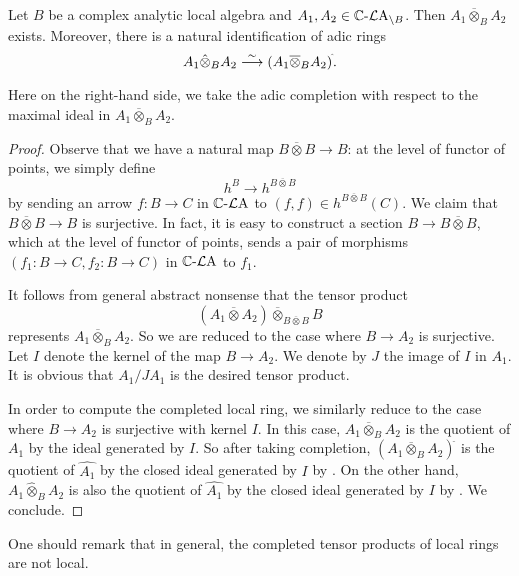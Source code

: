 \begin{thm}\label{thm-relanalytictensorexist}
    Let $B$ be a complex analytic local algebra and $A_1,A_2\in \mathbb{C}\text{-}\mathcal{L}\mathrm{A}_{\backslash B}$. Then $A_1\overline{\otimes}_B A_2$ exists. Moreover, there is a natural identification of adic rings
    \[
        A_1\hat{\otimes}_B A_2 \stackrel{\sim}{\longrightarrow} (A_1\overline{\otimes}_B A_2)^{\hat{}}.
    \]
\end{thm}
Here on the right-hand side, we take the adic completion with respect to the maximal ideal in $A_1\overline{\otimes}_B A_2$.
\begin{proof}
    Observe that we have a natural map $B\overline{\otimes} B\rightarrow B$: at the level of functor of points, we simply define
    \[
        h^B\rightarrow h^{B\overline{\otimes} B}
    \]
    by sending an arrow $f:B\rightarrow C$ in $\mathbb{C}\text{-}\mathcal{L}\mathrm{A}$ to $(f,f)\in h^{B\overline{\otimes} B}(C)$. We claim that $B\overline{\otimes} B\rightarrow B$ is surjective. In fact, it is easy to construct a section $B\rightarrow B\overline{\otimes} B$, which at the level of functor of points, sends a pair of morphisms  $(f_1:B\rightarrow C,f_2:B\rightarrow C)$ in $\mathbb{C}\text{-}\mathcal{L}\mathrm{A}$ to $f_1$.

    It follows from general abstract nonsense that the tensor product
    \[
        (A_1\overline{\otimes} A_2)\overline{\otimes}_{B\overline{\otimes} B} B  
    \]
    represents $A_1\overline{\otimes}_B A_2$. So we are reduced to the case where $B\rightarrow A_2$ is surjective. Let $I$ denote the kernel of the map $B\rightarrow A_2$. We denote by $J$ the image of $I$ in $A_1$. It is obvious that $A_1/JA_1$ is the desired tensor product.

    In order to compute the completed local ring, we similarly reduce to the case where $B\rightarrow A_2$ is surjective with kernel $I$. In this case, $A_1\overline{\otimes}_B A_2$ is the quotient of $A_1$ by the ideal generated by $I$. So after taking completion, $(A_1\overline{\otimes}_B A_2)^{\hat{}}$ is the quotient of $\hat{A_1}$ by the closed ideal generated by $I$ by \cite[\href{https://stacks.math.columbia.edu/tag/0ARZ}{Tag 0ARZ}]{stacks-project}. On the other hand, $A_1\hat{\otimes}_B A_2$ is also the quotient of $\hat{A_1}$ by the closed ideal generated by $I$ by \cite[\href{https://stacks.math.columbia.edu/tag/0AMZ}{Tag 0AMZ}]{stacks-project}. We conclude.
\end{proof}
\begin{remark}
    One should remark that in general, the completed tensor products of local rings are not local.
\end{remark}

\printbibliography
